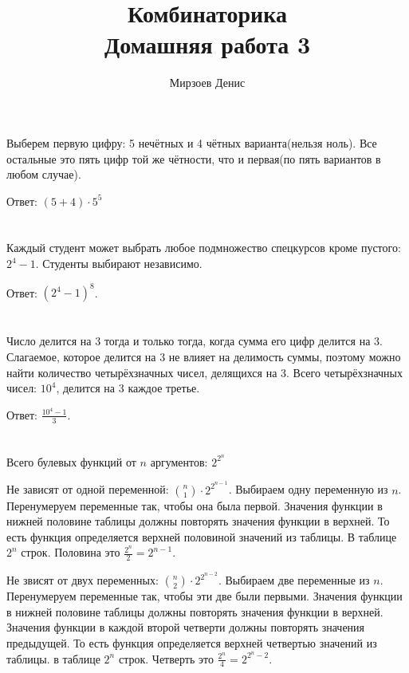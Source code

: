 \documentclass{article}
\title{Комбинаторика\\Домашняя работа 3}
\author{Мирзоев Денис}
\date{}
\begin{document}
\maketitle

\section{}

Выберем первую цифру: 5 нечётных и 4 чётных варианта(нельзя ноль).
Все остальные это пять цифр той же чётности, что и первая(по пять
вариантов в любом случае).

Ответ: $(5+4)\cdot5^5$

\section{} 

Каждый студент может выбрать любое подмножество спецкурсов кроме пустого:
$2^4-1$. Студенты выбирают независимо.

Ответ: $(2^4-1)^8$.

\section{} 

Число делится на 3 тогда и только тогда, когда сумма его цифр делится
на 3. Слагаемое, которое делится на 3 не влияет на делимость суммы,
поэтому можно найти количество четырёхзначных чисел, делящихся на 3.
Всего четырёхзначных чисел: $10^4$, делится на 3 каждое третье.

Ответ: $\frac{10^4-1}{3}$.

\section{}

Всего булевых функций от $n$ аргументов: $2^{2^n}$

Не зависят от одной переменной: ${n\choose 1} \cdot 2^{2^{n-1}}$. Выбираем одну
переменную из $n$. Перенумеруем переменные так, чтобы она была первой.
Значения функции в нижней половине таблицы должны повторять значения функции в
верхней. То есть функция определяется верхней половиной значений из таблицы.
В таблице $2^n$ строк. Половина это $\frac{2^n}{2} = 2^{n-1}$.

Не звисят от двух переменных: ${n\choose 2} \cdot 2^{2^{n-2}}$. Выбираем две
переменные из $n$. Перенумеруем переменные так, чтобы эти две были первыми.
Значения функции в нижней половине таблицы должны повторять значения функции в
верхней. Значения функции в каждой второй четверти должны повторять значения
предыдущей. То есть функция определяется верхней четвертью значений из таблицы.
в таблице $2^n$ строк. Четверть это $\frac{2^n}{4} = 2^{2^n-2}$.
\end{document}
